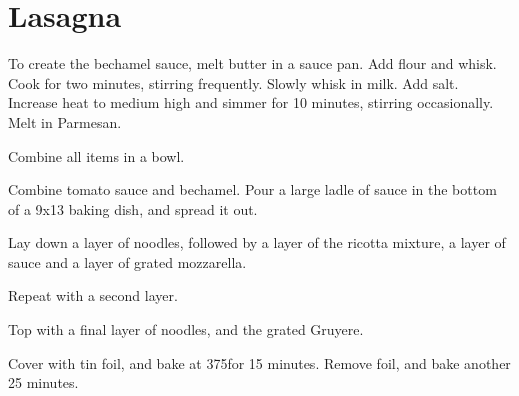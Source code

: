 
\section{Lasagna}
\begin{recipe}


To create the bechamel sauce, melt butter in a sauce pan. Add flour and whisk. Cook for two minutes, stirring frequently. Slowly whisk in milk. Add salt. Increase heat to medium high and simmer for 10 minutes, stirring occasionally. Melt in Parmesan.


Combine all items in a bowl.


Combine tomato sauce and bechamel. Pour a large ladle of sauce in the bottom of a 9x13 baking dish, and spread it out.

Lay down a layer of noodles, followed by a layer of the ricotta mixture, a layer of sauce and a layer of grated mozzarella.

Repeat with a second layer.


Top with a final layer of noodles, and the grated Gruyere.

Cover with tin foil, and bake at 375\degree for 15 minutes. Remove foil, and bake another 25 minutes.


\end{recipe}
